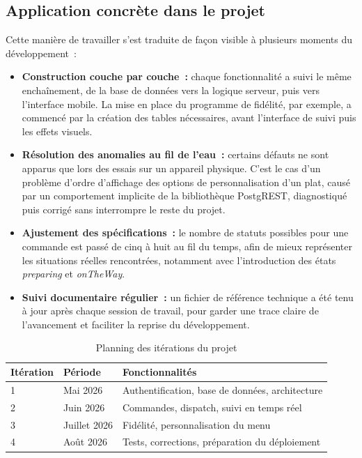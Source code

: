 \documentclass[12pt,fleqn,a4paper]{report}
\begin{document}
\begin{justify}
\subsection{Application concrète dans le projet}

Cette manière de travailler s'est traduite de façon visible à plusieurs moments du développement~:

\begin{itemize}
    \item \textbf{Construction couche par couche~:} chaque fonctionnalité a suivi le même enchaînement, de la base de données vers la logique serveur, puis vers l'interface mobile. La mise en place du programme de fidélité, par exemple, a commencé par la création des tables nécessaires, avant l'interface de suivi puis les effets visuels.
    \item \textbf{Résolution des anomalies au fil de l'eau~:} certains défauts ne sont apparus que lors des essais sur un appareil physique. C'est le cas d'un problème d'ordre d'affichage des options de personnalisation d'un plat, causé par un comportement implicite de la bibliothèque PostgREST, diagnostiqué puis corrigé sans interrompre le reste du projet.
    \item \textbf{Ajustement des spécifications~:} le nombre de statuts possibles pour une commande est passé de cinq à huit au fil du temps, afin de mieux représenter les situations réelles rencontrées, notamment avec l'introduction des états \textit{preparing} et \textit{onTheWay}.
    \item \textbf{Suivi documentaire régulier~:} un fichier de référence technique a été tenu à jour après chaque session de travail, pour garder une trace claire de l'avancement et faciliter la reprise du développement.
\end{itemize}

\begin{table}[H]
\centering
\begin{tabular}{|l|l|l|}
\hline
\textbf{Itération} & \textbf{Période} & \textbf{Fonctionnalités} \\
\hline
1 & Mai 2026 & Authentification, base de données, architecture \\
2 & Juin 2026 & Commandes, dispatch, suivi en temps réel \\
3 & Juillet 2026 & Fidélité, personnalisation du menu \\
4 & Août 2026 & Tests, corrections, préparation du déploiement \\
\hline
\end{tabular}
\caption{Planning des itérations du projet}
\end{table}


\end{justify}
\end{document}
